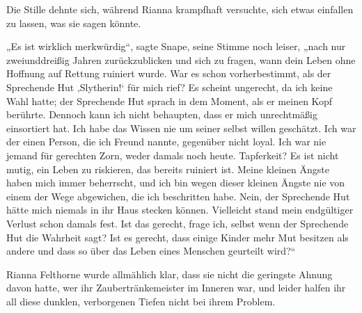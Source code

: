 Die Stille dehnte sich, während Rianna krampfhaft versuchte, sich etwas einfallen zu lassen, was sie sagen könnte.

„Es ist wirklich merkwürdig“, sagte Snape, seine Stimme noch leiser, „nach nur zweiunddreißig Jahren zurückzublicken und sich zu fragen, wann dein Leben ohne Hoffnung auf Rettung ruiniert wurde. War es schon vorherbestimmt, als der Sprechende Hut ‚Slytherin!‘ für mich rief? Es scheint ungerecht, da ich keine Wahl hatte; der Sprechende Hut sprach in dem Moment, als er meinen Kopf berührte. Dennoch kann ich nicht behaupten, dass er mich unrechtmäßig einsortiert hat. Ich habe das Wissen nie um seiner selbst willen geschätzt. Ich war der einen Person, die ich Freund nannte, gegenüber nicht loyal. Ich war nie jemand für gerechten Zorn, weder damals noch heute. Tapferkeit? Es ist nicht mutig, ein Leben zu riskieren, das bereits ruiniert ist. Meine kleinen Ängste haben mich immer beherrscht, und ich bin wegen dieser kleinen Ängste nie von einem der Wege abgewichen, die ich beschritten habe. Nein, der Sprechende Hut hätte mich niemals in ihr Haus stecken können. Vielleicht stand mein endgültiger Verlust schon damals fest. Ist das gerecht, frage ich, selbst wenn der Sprechende Hut die Wahrheit sagt? Ist es gerecht, dass einige Kinder mehr Mut besitzen als andere und dass so über das Leben eines Menschen geurteilt wird?“

Rianna Felthorne wurde allmählich klar, dass sie nicht die geringste Ahnung davon hatte, wer ihr Zaubertränkemeister im Inneren war, und leider halfen ihr all diese dunklen, verborgenen Tiefen nicht bei ihrem Problem.

